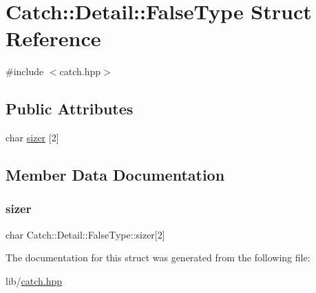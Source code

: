 \hypertarget{struct_catch_1_1_detail_1_1_false_type}{}\section{Catch\+:\+:Detail\+:\+:False\+Type Struct Reference}
\label{struct_catch_1_1_detail_1_1_false_type}


{\ttfamily \#include $<$catch.\+hpp$>$}

\subsection*{Public Attributes}
\begin{DoxyCompactItemize}
\item 
char \hyperlink{struct_catch_1_1_detail_1_1_false_type_abc1a730e197d6f7750ae8aaf47b63477}{sizer} \mbox{[}2\mbox{]}
\end{DoxyCompactItemize}


\subsection{Member Data Documentation}
\hypertarget{struct_catch_1_1_detail_1_1_false_type_abc1a730e197d6f7750ae8aaf47b63477}{}\label{struct_catch_1_1_detail_1_1_false_type_abc1a730e197d6f7750ae8aaf47b63477} 
\subsubsection{\texorpdfstring{sizer}{sizer}}
{\footnotesize\ttfamily char Catch\+::\+Detail\+::\+False\+Type\+::sizer\mbox{[}2\mbox{]}}



The documentation for this struct was generated from the following file\+:\begin{DoxyCompactItemize}
\item 
lib/\hyperlink{catch_8hpp}{catch.\+hpp}\end{DoxyCompactItemize}
